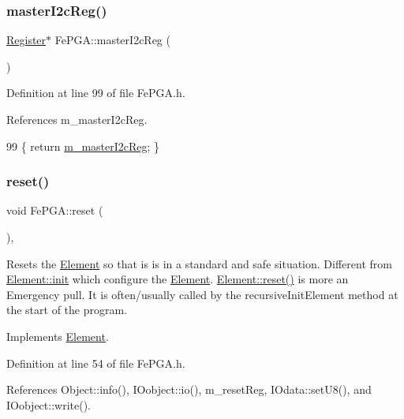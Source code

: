 \subsubsection{\texorpdfstring{master\+I2c\+Reg()}{masterI2cReg()}}
{\footnotesize\ttfamily \hyperlink{classRegister}{Register}$\ast$ Fe\+P\+G\+A\+::master\+I2c\+Reg (\begin{DoxyParamCaption}{ }\end{DoxyParamCaption})\hspace{0.3cm}{\ttfamily [inline]}}



Definition at line 99 of file Fe\+P\+G\+A.\+h.



References m\+\_\+master\+I2c\+Reg.


\begin{DoxyCode}
99 \{ \textcolor{keywordflow}{return} \hyperlink{classFePGA_adb390ea8de4a6cbce648dc62e4405f32}{m\_masterI2cReg}; \}
\end{DoxyCode}
\mbox{\label{classFePGA_abdf7a9dd901351a7eafd748d35172a3c}} 
\subsubsection{\texorpdfstring{reset()}{reset()}}
{\footnotesize\ttfamily void Fe\+P\+G\+A\+::reset (\begin{DoxyParamCaption}{ }\end{DoxyParamCaption})\hspace{0.3cm}{\ttfamily [inline]}, {\ttfamily [virtual]}}

Resets the \hyperlink{classElement}{Element} so that is is in a standard and safe situation. Different from \hyperlink{classElement_af42754b5cabc198869222725218d695c}{Element\+::init} which configure the \hyperlink{classElement}{Element}. \hyperlink{classElement_a69efffa22f06909d768149715565cb56}{Element\+::reset()} is more an Emergency pull. It is often/usually called by the recursive\+Init\+Element method at the start of the program. 

Implements \hyperlink{classElement_a69efffa22f06909d768149715565cb56}{Element}.



Definition at line 54 of file Fe\+P\+G\+A.\+h.



References Object\+::info(), I\+Oobject\+::io(), m\+\_\+reset\+Reg, I\+Odata\+::set\+U8(), and I\+Oobject\+::write().



